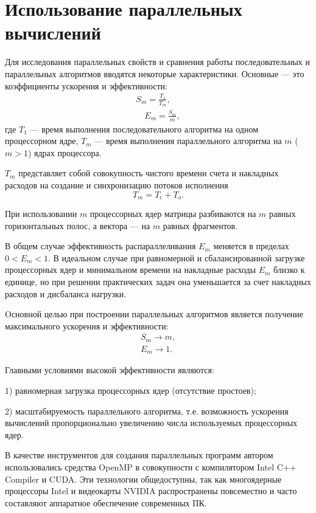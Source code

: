 \newpage
\section{Использование параллельных вычислений}
Для исследования параллельных свойств и сравнения работы последовательных и параллельных алгоритмов вводятся некоторые характеристики. Основные --- это коэффициенты ускорения и эффективности:
\begin{equation}\nonumber
\begin{aligned}
S_m=\frac{T_1}{T_m},\\[16pt]
\quad E_m=\frac{S_m}{m},
\end{aligned}
\end{equation}
где 
$T_1$ --- время выполнения последовательного алгоритма на одном
процессорном ядре,
$T_m$ --- время выполнения параллельного алгоритма на $m$ ($m>1$) ядрах процессора.

$T_m$ представляет собой совокупность чистого времени счета 
и накладных расходов на создание и синхронизацию потоков исполнения $$T_m=T_c+T_o.$$

При использовании $m$ процессорных ядер матрицы разбиваются на $m$ равных горизонтальных полос, а вектора --- на $m$ равных фрагментов.

В общем случае эффективность распараллеливания $E_m$ меняется в пределах $0<E_m<1$. В идеальном случае при равномерной и сбалансированной загрузке процессорных ядер и минимальном времени на накладные расходы $E_m$ близко к единице, но при решении практических задач  она уменьшается за счет накладных расходов и дисбаланса нагрузки.

Oсновной целью при построении параллельных алгоритмов является получение максимального ускорения и эффективности:
\begin{equation}\nonumber
\begin{aligned}
S_m \rightarrow m, \\[16pt]
E_m \rightarrow 1.
\end{aligned}
\end{equation}

Главными условиями высокой эффективности являются:

1) равномерная загрузка процессорных ядер (отсутствие простоев);

2) масштабируемость параллельного алгоритма, т.е. возможность ускорения вычислений
пропорционально увеличению числа используемых процессорных ядер.

В качестве инструментов для создания параллельных программ автором использовались средства OpenMP в совокупности с компилятором Intel C++ Compiler и CUDA. Эти технологии общедоступны, так как многоядерные процессоры Intel и видеокарты NVIDIA распространены повсеместно и часто составляют аппаратное обеспечение современных ПК. 

